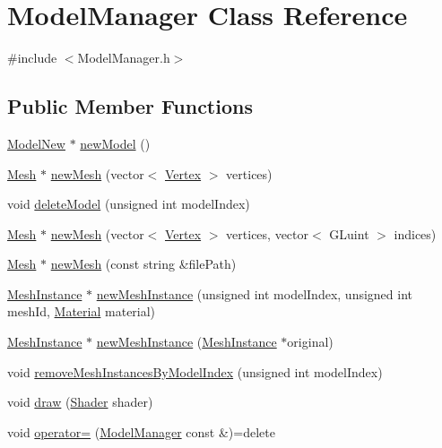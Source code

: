 \hypertarget{class_model_manager}{}\section{Model\+Manager Class Reference}
\label{class_model_manager}


{\ttfamily \#include $<$Model\+Manager.\+h$>$}

\subsection*{Public Member Functions}
\begin{DoxyCompactItemize}
\item 
\hyperlink{class_model_new}{Model\+New} $\ast$ \hyperlink{class_model_manager_adfde1d928ecc4b045aaca986b7921af4}{new\+Model} ()
\item 
\hyperlink{class_mesh}{Mesh} $\ast$ \hyperlink{class_model_manager_a508fce5dc8e782d38b3cf1fdbdb7ac4f}{new\+Mesh} (vector$<$ \hyperlink{struct_vertex}{Vertex} $>$ vertices)
\item 
void \hyperlink{class_model_manager_a44a142640c43cf2f4aab49dbb70c034e}{delete\+Model} (unsigned int model\+Index)
\item 
\hyperlink{class_mesh}{Mesh} $\ast$ \hyperlink{class_model_manager_a881a1d136c05a9e7208c92c7109ae46a}{new\+Mesh} (vector$<$ \hyperlink{struct_vertex}{Vertex} $>$ vertices, vector$<$ G\+Luint $>$ indices)
\item 
\hyperlink{class_mesh}{Mesh} $\ast$ \hyperlink{class_model_manager_a103637a3eb4240f9f1958e5c4b59f650}{new\+Mesh} (const string \&file\+Path)
\item 
\hyperlink{class_mesh_instance}{Mesh\+Instance} $\ast$ \hyperlink{class_model_manager_a5620a615f11fc4db7f536b9add1766d9}{new\+Mesh\+Instance} (unsigned int model\+Index, unsigned int mesh\+Id, \hyperlink{struct_material}{Material} material)
\item 
\hyperlink{class_mesh_instance}{Mesh\+Instance} $\ast$ \hyperlink{class_model_manager_aa1ccd7701ef0e4cc0531c667f153bce3}{new\+Mesh\+Instance} (\hyperlink{class_mesh_instance}{Mesh\+Instance} $\ast$original)
\item 
void \hyperlink{class_model_manager_af10dd7af64cb4b4e5f5a0668e6f34c17}{remove\+Mesh\+Instances\+By\+Model\+Index} (unsigned int model\+Index)
\item 
void \hyperlink{class_model_manager_a0ab4bcae0008b117f70979d4d8492a92}{draw} (\hyperlink{class_shader}{Shader} shader)
\item 
void \hyperlink{class_model_manager_a2a5e7ca1dd578fb47aa74f013bb1c9b4}{operator=} (\hyperlink{class_model_manager}{Model\+Manager} const \&)=delete
\end{DoxyCompactItemize}
